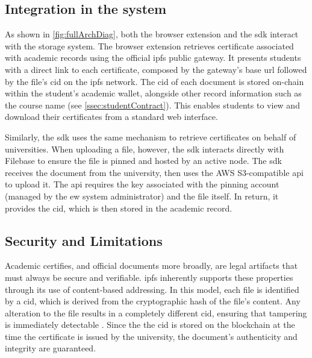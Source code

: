 \subsection{Integration in the system}
As shown in \cref{fig:fullArchDiag}, both the browser extension and the \acrshort{sdk} interact with the storage system. The browser extension retrieves certificate associated with academic records using the official \acrshort{ipfs} public gateway. It presents students with a direct link to each certificate, composed by the gateway's base \acrshort{url} followed by the file's \acrfull{cid} on the \acrshort{ipfs} network. The \acrshort{cid} of each document is stored on-chain within the student's academic wallet, alongside other record information such as the course name (see \cref{ssec:studentContract}). This enables students to view and download their certificates from a standard web interface.

Similarly, the \acrshort{sdk} uses the same mechanism to retrieve certificates on behalf of universities. When uploading a file, however, the \acrshort{sdk} interacts directly with Filebase to ensure the file is pinned and hosted by an active node. The \acrshort{sdk} receives the document from the university, then uses the AWS S3-compatible \acrshort{api} to upload it. The \acrshort{api} requires the key associated with the pinning account (managed by the \acrshort{ew} system administrator) and the file itself. In return, it provides the \acrshort{cid}, which is then stored in the academic record.

\subsection{Security and Limitations}
Academic certifies, and official documents more broadly, are legal artifacts that must always be secure and verifiable. \acrshort{ipfs} inherently supports these properties through its use of content-based addressing. In this model, each file is identified by a \acrshort{cid}, which is derived from the cryptographic hash of the file's content. Any alteration to the file results in a completely different \acrshort{cid}, ensuring that tampering is immediately detectable \cite{benet2014ipfscontentaddressed}. Since the the \acrshort{cid} is stored on the blockchain at the time the certificate is issued by the university, the document's authenticity and integrity are guaranteed.

